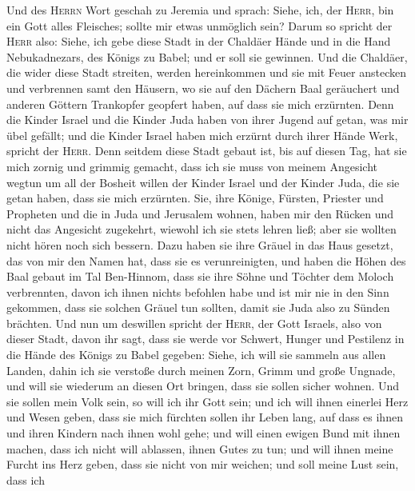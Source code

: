  Und des \textsc{Herrn} Wort geschah zu Jeremia und
sprach:  Siehe, ich, der \textsc{Herr}, bin ein Gott
alles Fleisches; sollte mir etwas unmöglich sein?  Darum
so spricht der \textsc{Herr} also: Siehe, ich gebe diese Stadt in der
Chaldäer Hände und in die Hand Nebukadnezars, des Königs zu Babel; und
er soll sie gewinnen.  Und die Chaldäer, die wider diese
Stadt streiten, werden hereinkommen und sie mit Feuer anstecken und
verbrennen samt den Häusern, wo sie auf den Dächern Baal geräuchert und
anderen Göttern Trankopfer geopfert haben, auf dass sie mich erzürnten.
 Denn die Kinder Israel und die Kinder Juda haben von
ihrer Jugend auf getan, was mir übel gefällt; und die Kinder Israel
haben mich erzürnt durch ihrer Hände Werk, spricht der \textsc{Herr}.
 Denn seitdem diese Stadt gebaut ist, bis auf diesen Tag,
hat sie mich zornig und grimmig gemacht, dass ich sie muss von meinem
Angesicht wegtun  um all der Bosheit willen der Kinder
Israel und der Kinder Juda, die sie getan haben, dass sie mich
erzürnten. Sie, ihre Könige, Fürsten, Priester und Propheten und die in
Juda und Jerusalem wohnen,  haben mir den Rücken und
nicht das Angesicht zugekehrt, wiewohl ich sie stets lehren ließ; aber
sie wollten nicht hören noch sich bessern.  Dazu haben
sie ihre Gräuel in das Haus gesetzt, das von mir den Namen hat, dass sie
es verunreinigten,  und haben die Höhen des Baal gebaut
im Tal Ben-Hinnom, dass sie ihre Söhne und Töchter dem Moloch
verbrennten, davon ich ihnen nichts befohlen habe und ist mir nie in den
Sinn gekommen, dass sie solchen Gräuel tun sollten, damit sie Juda also
zu Sünden brächten.  Und nun um deswillen spricht der
\textsc{Herr}, der Gott Israels, also von dieser Stadt, davon ihr sagt,
dass sie werde vor Schwert, Hunger und Pestilenz in die Hände des Königs
zu Babel gegeben:  Siehe, ich will sie sammeln aus allen
Landen, dahin ich sie verstoße durch meinen Zorn, Grimm und große
Ungnade, und will sie wiederum an diesen Ort bringen, dass sie sollen
sicher wohnen.  Und sie sollen mein Volk sein, so will
ich ihr Gott sein;  und ich will ihnen einerlei Herz und
Wesen geben, dass sie mich fürchten sollen ihr Leben lang, auf dass es
ihnen und ihren Kindern nach ihnen wohl gehe;  und will
einen ewigen Bund mit ihnen machen, dass ich nicht will ablassen, ihnen
Gutes zu tun; und will ihnen meine Furcht ins Herz geben, dass sie nicht
von mir weichen;  und soll meine Lust sein, dass ich
